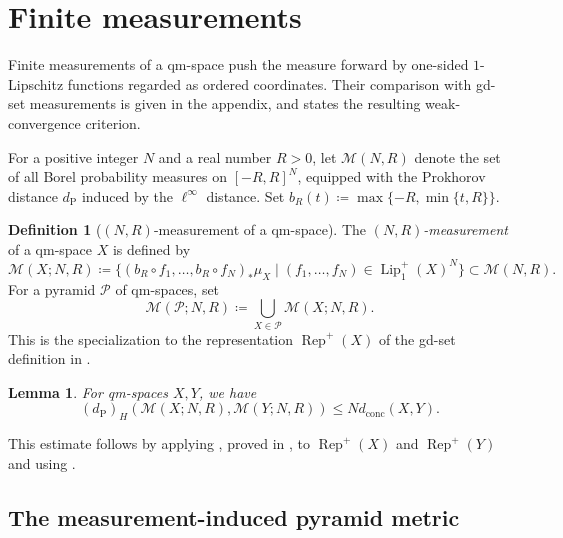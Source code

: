 \documentclass{amsart}
\theoremstyle{plain}
\newtheorem{lemma}[theorem]{Lemma}
\theoremstyle{definition}
\newtheorem{definition}[theorem]{Definition}
\theoremstyle{remark}
\newcommand{\M}{\mathcal{M}}
\newcommand{\lipplus}{\operatorname{Lip}^{+}_{1}}
\newcommand{\dconc}{d_{\operatorname{conc}}}
\newcommand{\dpr}{d_{\operatorname{P}}}
\newcommand{\haus}[1]{\left(#1\right)_H}
\begin{document}
\section{Finite measurements}
\label{sec:ordered-measurements}

Finite measurements of a qm-space push the measure forward by one-sided $1$-Lipschitz functions regarded as ordered coordinates. Their comparison with gd-set measurements is given in the appendix, and  states the resulting weak-convergence criterion.

For a positive integer $N$ and a real number $R>0$, let $\M(N,R)$ denote the set of all Borel probability measures on $[-R,R]^N$, equipped with the Prokhorov distance $\dpr$ induced by the $\ell^\infty$ distance. Set $b_R(t)\coloneqq\max\{-R,\min\{t,R\}\}$.

\begin{definition}[$(N,R)$-measurement of a qm-space]
\label{def:ordered-measurement}
The \emph{$(N,R)$-measurement} of a qm-space $X$ is defined by
\[
\M(X;N,R)\coloneqq\{(b_R\circ f_1,\ldots,b_R\circ f_N)_*\mu_X\mid(f_1,\ldots,f_N)\in\lipplus(X)^N\}\subset\M(N,R).
\]
For a pyramid $\mathcal P$ of qm-spaces, set
\[\M(\mathcal P;N,R)\coloneqq\bigcup_{X\in\mathcal P}\M(X;N,R).\]
This is the specialization to the representation $\operatorname{Rep}^{+}(X)$ of the gd-set definition in .
\end{definition}

\begin{lemma}
\label{lem:ordered-measurement-stability}
For qm-spaces $X,Y$, we have
\begin{equation}
\label{eq:dconc-controls-ordered}
\haus{\dpr}(\M(X;N,R),\M(Y;N,R))\leq N\dconc(X,Y).
\end{equation}
\end{lemma}

This estimate follows by applying , proved in , to $\operatorname{Rep}^{+}(X)$ and $\operatorname{Rep}^{+}(Y)$ and using .

\subsection{The measurement-induced pyramid metric}
\end{document}
